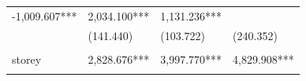 \documentclass[]{book}
\begin{document}
\begin{longtable}[]{@{}llll@{}}
\begin{minipage}[t]{0.24\columnwidth}
-1,009.607***\strut
\end{minipage} & \begin{minipage}[t]{0.24\columnwidth}\raggedright\strut
2,034.100***\strut
\end{minipage} & \begin{minipage}[t]{0.24\columnwidth}\raggedright\strut
1,131.236***\strut
\end{minipage}\tabularnewline
\begin{minipage}[t]{0.17\columnwidth}\raggedright\strut
\strut
\end{minipage} & \begin{minipage}[t]{0.24\columnwidth}\raggedright\strut
(141.440)\strut
\end{minipage} & \begin{minipage}[t]{0.24\columnwidth}\raggedright\strut
(103.722)\strut
\end{minipage} & \begin{minipage}[t]{0.24\columnwidth}\raggedright\strut
(240.352)\strut
\end{minipage}\tabularnewline
\begin{minipage}[t]{0.17\columnwidth}\raggedright\strut
\strut
\end{minipage} & \begin{minipage}[t]{0.24\columnwidth}\raggedright\strut
\strut
\end{minipage} & \begin{minipage}[t]{0.24\columnwidth}\raggedright\strut
\strut
\end{minipage} & \begin{minipage}[t]{0.24\columnwidth}\raggedright\strut
\strut
\end{minipage}\tabularnewline
\begin{minipage}[t]{0.17\columnwidth}\raggedright\strut
storey\strut
\end{minipage} & \begin{minipage}[t]{0.24\columnwidth}\raggedright\strut
2,828.676***\strut
\end{minipage} & \begin{minipage}[t]{0.24\columnwidth}\raggedright\strut
3,997.770***\strut
\end{minipage} & \begin{minipage}[t]{0.24\columnwidth}\raggedright\strut
4,829.908***\strut
\end{minipage}\tabularnewline
\begin{minipage}[t]{0.17\columnwidth}\raggedright\strut
\strut
\end{minipage} & \begin{minipage}[t]{0.24\columnwidth}\raggedright\strut

\end{minipage}
\end{longtable}
\end{document}
